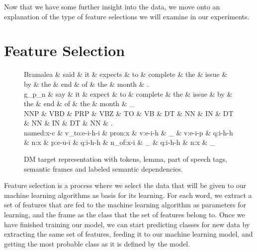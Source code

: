 Now that we have some further insight into the data, we move onto an explanation of the type of feature selections we will examine in our experiments. 

\section{Feature Selection}
\label{features}

\begin{figure}
    \centering
    \smaller[]
    \smaller[]
    \smaller[]
    \begin{dependency}[]
        \begin{deptext}[column sep=0.5em, row sep=.1ex]
            Bramalea \& said \& it \& expects \& to \& complete \& the \& issue \& by \& the \& end \& of \& the \& month \& . \\
            
            g\_p\_n \& say \& it \& expect \& to \& complete \& the \& issue \& by \& the \& end \& of \& the \& month \& \_ \\
            
            NNP \& VBD \& PRP \& VBZ \& TO \& VB \& DT \& NN \& IN \& DT \& NN \& IN \& DT \& NN \& . \\
            
            named:x-c \& v\_to:e-i-h-i \& pron:x \& v:e-i-h \& \_ \& v:e-i-p \& q:i-h-h \& n:x \& p:e-u-i \& q:i-h-h \& n\_of:x-i \& \_ \& q:i-h-h \& n:x \& \_ \\
        \end{deptext}
    \end{dependency}
    \caption{DM target representation with tokens, lemma, part of speech tags, semantic frames and labeled semantic dependencies.}
    \label{DM:all}
\end{figure}

Feature selection is a process where we select the data that will be given to our machine learning algorithms as basis for its learning. For each word, we extract a set of features that are fed to the machine learning algorithm as parameters for learning, and the frame as the class that the set of features belong to. Once we have finished training our model, we can start predicting classes for new data by extracting the same set of features, feeding it to our machine learning model, and getting the most probable class as it is defined by the model.


